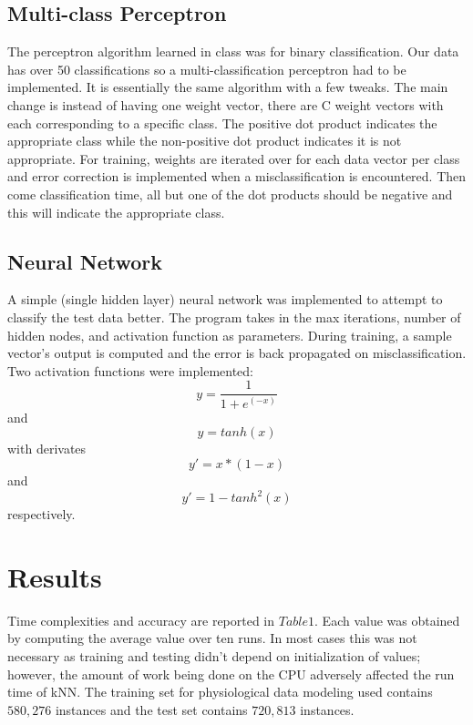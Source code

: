 \documentclass[twoside]{article}
\begin{document}
\begin{multicols}{2}
\subsection{Multi-class Perceptron}
The perceptron algorithm learned in class was for binary classification. Our data has over 50 classifications so a multi-classification perceptron had to be implemented.  It is essentially the same algorithm with a few tweaks.  The main change is instead of having one weight vector, there are C weight vectors with each corresponding to a specific class.  The positive dot product indicates the appropriate class while the non-positive dot product indicates it is not appropriate.  For training, weights are iterated over for each data vector per class and error correction is implemented when a misclassification is encountered.  Then come classification time, all but one of the dot products should be negative and this will indicate the appropriate class.  

\subsection{Neural Network}
A simple (single hidden layer) neural network was implemented to attempt to classify the test data better.  The program takes in the max iterations, number of hidden nodes, and activation function as parameters.  During training, a sample vector's output is computed and the error is back propagated on misclassification.  Two activation functions were implemented: 
\begin{equation}
\label{activ1}
y=\frac{1}{1+e^(-x)}
\end{equation}
and 
\begin{equation}
\label{activ2}
y=tanh(x)
\end{equation}
with derivates
\begin{equation}
\label{deriv1}
y'=x*(1-x)
\end{equation}
and 
\begin{equation}
\label{deriv2}
y'=1-tanh^2 (x)
\end{equation}
respectively.

\section{Results}

Time complexities and accuracy are reported in $Table 1$.  Each value was obtained by computing the average value over ten runs.  In most cases this was not necessary as training and testing didn't depend on initialization of values; however, the amount of work being done on the CPU adversely affected the run time of kNN.  The training set for physiological data modeling used contains $580,276$ instances and the test set contains $720,813$ instances.


\end{multicols}
\end{document}

